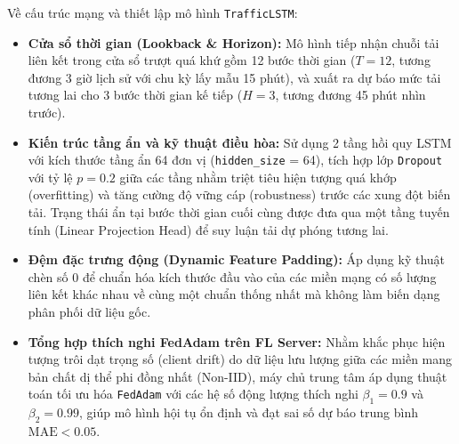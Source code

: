 \documentclass[11pt,a4paper]{article}
\begin{document}
Về cấu trúc mạng và thiết lập mô hình \texttt{TrafficLSTM}:
\begin{itemize}[leftmargin=1.5em, itemsep=0.3ex]
    \item \textbf{Cửa sổ thời gian (Lookback \& Horizon):} Mô hình tiếp nhận chuỗi tải liên kết trong cửa sổ trượt quá khứ gồm 12 bước thời gian ($T = 12$, tương đương 3 giờ lịch sử với chu kỳ lấy mẫu 15 phút), và xuất ra dự báo mức tải tương lai cho 3 bước thời gian kế tiếp ($H = 3$, tương đương 45 phút nhìn trước).
    \item \textbf{Kiến trúc tầng ẩn và kỹ thuật điều hòa:} Sử dụng 2 tầng hồi quy LSTM với kích thước tầng ẩn 64 đơn vị (\texttt{hidden\_size} = 64), tích hợp lớp \texttt{Dropout} với tỷ lệ $p = 0.2$ giữa các tầng nhằm triệt tiêu hiện tượng quá khớp (overfitting) và tăng cường độ vững cáp (robustness) trước các xung đột biến tải. Trạng thái ẩn tại bước thời gian cuối cùng được đưa qua một tầng tuyến tính (Linear Projection Head) để suy luận tải dự phóng tương lai.
    \item \textbf{Đệm đặc trưng động (Dynamic Feature Padding):} Áp dụng kỹ thuật chèn số 0 để chuẩn hóa kích thước đầu vào của các miền mạng có số lượng liên kết khác nhau về cùng một chuẩn thống nhất mà không làm biến dạng phân phối dữ liệu gốc.
    \item \textbf{Tổng hợp thích nghi FedAdam trên FL Server:} Nhằm khắc phục hiện tượng trôi dạt trọng số (client drift) do dữ liệu lưu lượng giữa các miền mang bản chất dị thể phi đồng nhất (Non-IID), máy chủ trung tâm áp dụng thuật toán tối ưu hóa \texttt{FedAdam} với các hệ số động lượng thích nghi $\beta_1 = 0.9$ và $\beta_2 = 0.99$, giúp mô hình hội tụ ổn định và đạt sai số dự báo trung bình $\text{MAE} < 0.05$.
\end{itemize}
\end{document}
